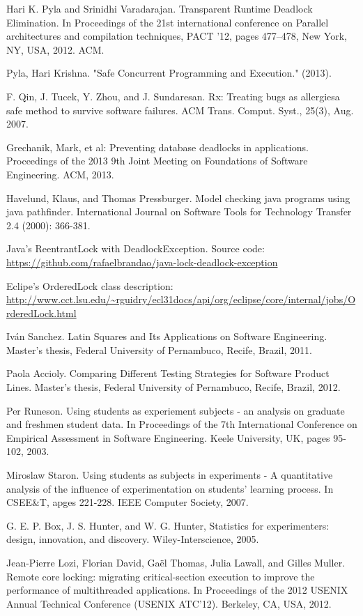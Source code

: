 \begin{thebibliography}{4}
 Hari K. Pyla and Srinidhi Varadarajan. Transparent Runtime Deadlock Elimination. In
Proceedings of the 21st international conference on Parallel architectures and compilation
techniques, PACT ’12, pages 477–478, New York, NY, USA, 2012. ACM.

 Pyla, Hari Krishna. "Safe Concurrent Programming and Execution." (2013).

 F. Qin, J. Tucek, Y. Zhou, and J. Sundaresan. Rx: Treating bugs as
allergiesa safe method to survive software failures. ACM Trans. Comput.
Syst., 25(3), Aug. 2007.

 Grechanik, Mark, et al: Preventing database deadlocks in applications.
Proceedings of the 2013 9th Joint Meeting on Foundations of Software Engineering. ACM, 2013.

 Havelund, Klaus, and Thomas Pressburger. Model checking java programs using java pathfinder. International Journal on Software Tools for Technology Transfer 2.4 (2000): 366-381.

 Java's ReentrantLock with DeadlockException. Source code: \url{https://github.com/rafaelbrandao/java-lock-deadlock-exception}

 Eclipe's OrderedLock class description: \url{http://www.cct.lsu.edu/~rguidry/ecl31docs/api/org/eclipse/core/internal/jobs/OrderedLock.html}

 Iván Sanchez. Latin Squares and Its Applications on Software Engineering. Master's thesis, Federal University of Pernambuco, Recife, Brazil, 2011.

 Paola Accioly. Comparing Different Testing Strategies for Software Product Lines. Master's thesis, Federal University of Pernambuco, Recife, Brazil, 2012.

 Per Runeson. Using students as experiement subjects - an analysis on graduate and freshmen student data. In Proceedings of the 7th International Conference on Empirical Assessment in Software Engineering. Keele University, UK, pages 95-102, 2003.

 Miroslaw Staron. Using students as subjects in experiments - A quantitative analysis of the influence of experimentation on students' learning process. In CSEE\&T, apges 221-228. IEEE Computer Society, 2007.

 G. E. P. Box, J. S. Hunter, and W. G. Hunter, Statistics for experimenters: design, innovation, and discovery. Wiley-Interscience, 2005.

 Jean-Pierre Lozi, Florian David, Ga\"{e}l Thomas, Julia Lawall, and Gilles Muller. Remote core locking: migrating critical-section execution to improve the performance of multithreaded applications. In Proceedings of the 2012 USENIX Annual Technical Conference (USENIX ATC'12). Berkeley, CA, USA, 2012.

\end{thebibliography}